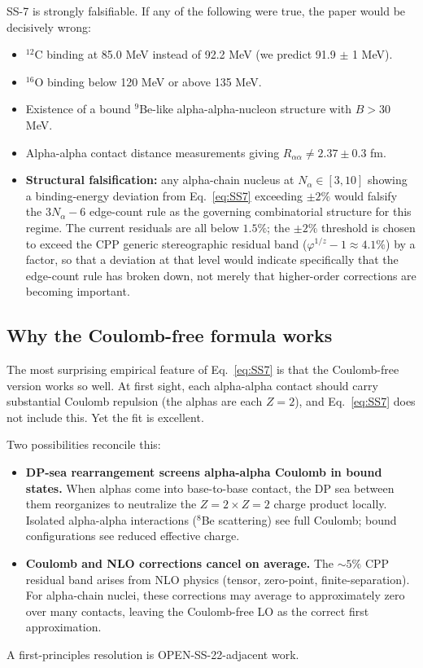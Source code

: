 \documentclass[11pt,letterpaper]{article}
\newcommand{\phig}{\varphi}
\newcommand{\Nalpha}{N_{\alpha}}
\newcommand{\Raa}{R_{\alpha\alpha}}
\begin{document}
SS-7 is strongly falsifiable. If any of the following were true, the paper would be decisively wrong:
\begin{itemize}
\item ${}^{12}$C binding at 85.0 MeV instead of 92.2 MeV (we predict 91.9 $\pm$ 1 MeV).
\item ${}^{16}$O binding below 120 MeV or above 135 MeV.
\item Existence of a bound ${}^9$Be-like alpha-alpha-nucleon structure with $B > 30$ MeV.
\item Alpha-alpha contact distance measurements giving $\Raa \ne 2.37 \pm 0.3$ fm.
\item \textbf{Structural falsification:} any alpha-chain nucleus at $\Nalpha \in [3, 10]$ showing a binding-energy deviation from Eq.~\ref{eq:SS7} exceeding $\pm 2\%$ would falsify the $3\Nalpha - 6$ edge-count rule as the governing combinatorial structure for this regime. The current residuals are all below $1.5\%$; the $\pm 2\%$ threshold is chosen to exceed the CPP generic stereographic residual band ($\phig^{1/z} - 1 \approx 4.1\%$) by a factor, so that a deviation at that level would indicate specifically that the edge-count rule has broken down, not merely that higher-order corrections are becoming important.
\end{itemize}

\subsection{Why the Coulomb-free formula works}

The most surprising empirical feature of Eq.~\ref{eq:SS7} is that the Coulomb-free version works so well. At first sight, each alpha-alpha contact should carry substantial Coulomb repulsion (the alphas are each $Z = 2$), and Eq.~\ref{eq:SS7} does not include this. Yet the fit is excellent.

Two possibilities reconcile this:
\begin{itemize}
\item \textbf{DP-sea rearrangement screens alpha-alpha Coulomb in bound states.} When alphas come into base-to-base contact, the DP sea between them reorganizes to neutralize the $Z = 2 \times Z = 2$ charge product locally. Isolated alpha-alpha interactions (${}^8$Be scattering) see full Coulomb; bound configurations see reduced effective charge.
\item \textbf{Coulomb and NLO corrections cancel on average.} The $\sim 5\%$ CPP residual band arises from NLO physics (tensor, zero-point, finite-separation). For alpha-chain nuclei, these corrections may average to approximately zero over many contacts, leaving the Coulomb-free LO as the correct first approximation.
\end{itemize}
A first-principles resolution is OPEN-SS-22-adjacent work.
\end{document}
